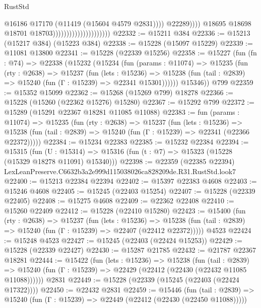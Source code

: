 \begin{lexlean}{RustStd}
\begin{coremodule}
                                                          @16186
                                                          @17170
                                                          (@11419 (@15604 @4579 @2831))))
                                                      @22289))))
                                              @18695
                                              @18698
                                              @18701
                                              @18703)))))))))))))))))))))
@22332 := @15211 @384
@22336 := @15213 (@15217 @384) (@15223 @384)
@22338 := @15228 (@15097 @15229)
@22339 := @11081 @13800
@22341 := @15228 (@22339 @15256)
@22358 := @15227
    (fun (fn : @74) =>
    @22338
      (@15232
        (@15234
          (fun (params : @11074) =>
          @15235
            (fun (rty : @2638) =>
            @15237
              (fun (lets : @15236) =>
              @15238 (fun (tail : @2839) => @15240 (fun (Γ : @15239) => @22341 @15301))))))
        @15346))
    @799
@22359 := @15352 @15099
@22362 := @15268 (@15269 @799) @18278
@22366 := @15228 (@15260 (@22362 @15276) @15280)
@22367 := @15292 @799
@22372 := @15289 (@15291 @22367 @18281 @11085 @11088)
@22383 := fun (params : @11074) =>
  @15235
    (fun (rty : @2638) =>
    @15237
      (fun (lets : @15236) =>
      @15238 (fun (tail : @2839) => @15240 (fun (Γ : @15239) => @22341 (@22366 @22372)))))
@22384 := @15234 @22383
@22385 := @15232 @22384
@22394 := @15315
    (fun (U : @15314) => @15316 (fun (t : @7) => @15323 (@15228 (@15329 @18278 @11091) @15340)))
@22398 := @22359 (@22385 @22394) LexLeanPreserve.C6632b3a2e999d115038026ca828209de.R31.RustStd.look7
@22400 := @15213 @22384 @22394
@22402 := @15397 @22383 @4608
@22403 := @15246 @4608
@22405 := @15245 (@22403 @15254)
@22407 := @15228 (@22339 @22405)
@22408 := @15275 @4608
@22409 := @22362 @22408
@22410 := @15260 @22409
@22412 := @15228 (@22410 @15280)
@22423 := @15400
    (fun (rty : @2638) =>
    @15237
      (fun (lets : @15236) =>
      @15238 (fun (tail : @2839) => @15240 (fun (Γ : @15239) => @22407 (@22412 @22372)))))
    @4523
@22424 := @15248 @4523
@22427 := @15245 (@22403 (@22424 @15253))
@22429 := @15228 (@22339 @22427)
@22430 := @15287 @21785
@22432 := @21787 @22367 @18281
@22444 := @15422
    (fun (lets : @15236) =>
    @15238
      (fun (tail : @2839) =>
      @15240 (fun (Γ : @15239) => @22429 (@22412 (@22430 (@22432 @11085 @11088))))))
    @2831
@22449 := @15228 (@22339 (@15245 (@22403 (@22424 @17322))))
@22450 := @22432 @2831
@22459 := @15446
    (fun (tail : @2839) => @15240 (fun (Γ : @15239) => @22449 (@22412 (@22430 (@22450 @11088)))))

\end{coremodule}
\end{lexlean}

